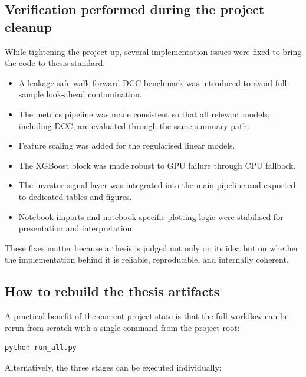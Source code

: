 \subsection{Verification performed during the project cleanup}

While tightening the project up, several implementation issues were fixed to bring the code to thesis standard.

\begin{itemize}
    \item A leakage-safe walk-forward DCC benchmark was introduced to avoid full-sample look-ahead contamination.
    \item The metrics pipeline was made consistent so that all relevant models, including DCC, are evaluated through the same summary path.
    \item Feature scaling was added for the regularised linear models.
    \item The XGBoost block was made robust to GPU failure through CPU fallback.
    \item The investor signal layer was integrated into the main pipeline and exported to dedicated tables and figures.
    \item Notebook imports and notebook-specific plotting logic were stabilised for presentation and interpretation.
\end{itemize}

These fixes matter because a thesis is judged not only on its idea but on whether the implementation behind it is reliable, reproducible, and internally coherent.

\subsection{How to rebuild the thesis artifacts}

A practical benefit of the current project state is that the full workflow can be rerun from scratch with a single command from the project root:

\begin{lstlisting}[language={}, caption={Full rebuild from the project root directory.}, label=lst:rebuild]
python run_all.py
\end{lstlisting}

Alternatively, the three stages can be executed individually:

